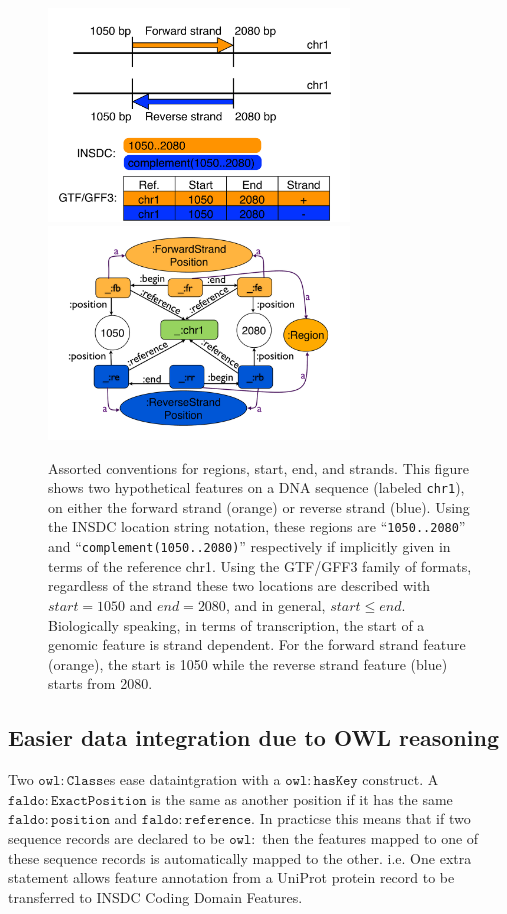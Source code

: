 \begin{figure}
\begin{center}
\includegraphics[width=8cm]{figures/figures.pdf}
\includegraphics[width=8cm]{figures/figures3.pdf}
\end{center}
\caption{Assorted conventions for regions, start, end, and strands.
This figure shows two hypothetical features on a DNA sequence
(labeled \texttt{chr1}), on either the forward strand (orange) or
reverse strand (blue).
Using the INSDC location string notation, these regions are
``\texttt{1050..2080}'' and ``\texttt{complement(1050..2080)}''
respectively if implicitly given in terms of the reference chr1.
Using the GTF/GFF3 family of formats, regardless of the
strand these two locations are described with $start = 1050$
and $end = 2080$, and in general, $start \leq end$.
Biologically speaking, in terms of transcription, the start of a genomic
feature is strand dependent.
For the forward strand feature (orange), the start is 1050
while the reverse strand feature (blue) starts from 2080.}
\label{fig:strands}
\end{figure}

\subsection*{Easier data integration due to OWL reasoning}

Two $\mathtt{owl\colon{}Class}$es ease dataintgration with a $\mathtt{owl\colon{}hasKey}$ construct. 
A $\mathtt{faldo\colon{}ExactPosition}$ is the same as another position if it has the same $\mathtt{faldo\colon{}position}$ and $\mathtt{faldo\colon{}reference}$.
In practicse this means that if two sequence records are declared to be $\mathtt{owl\colon{}}$ then the features mapped to one of these sequence records is automatically mapped to the other.
i.e. One extra statement allows feature annotation from a UniProt protein record to be transferred to INSDC Coding Domain Features.

